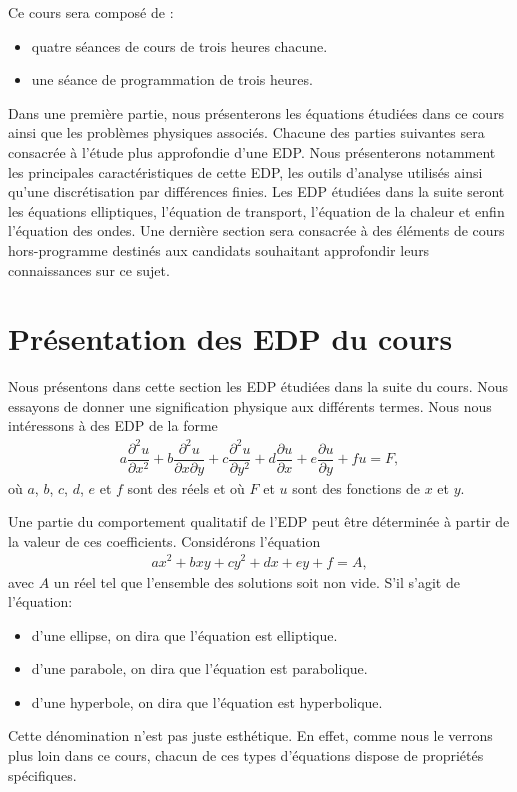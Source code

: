 \documentclass[12pt,a4paper,twoside]{article}
\begin{document}
Ce cours sera compos\'e de :
\begin{itemize}
\item quatre s\'eances de cours de trois heures chacune.
\item une s\'eance de programmation de trois heures.
\end{itemize}
Dans une premi\`ere partie, nous pr\'esenterons les \'equations \'etudi\'ees
dans ce cours ainsi que les probl\`emes physiques associ\'es.
Chacune des parties suivantes sera consacr\'ee \`a l'\'etude plus approfondie
d'une EDP. Nous pr\'esenterons notamment les principales caract\'eristiques de cette EDP,
les outils d'analyse utilis\'es ainsi qu'une discr\'etisation par diff\'erences finies.
Les EDP \'etudi\'ees dans la suite seront les \'equations elliptiques,
l'\'equation de transport, l'\'equation de la chaleur et enfin
l'\'equation des ondes.
Une derni\`ere section sera consacr\'ee \`a des \'el\'ements de cours
hors-programme destin\'es aux candidats souhaitant approfondir
leurs connaissances sur ce sujet.

\newpage

\section{Pr\'esentation des EDP du cours}

Nous pr\'esentons dans cette section les EDP \'etudi\'ees dans la suite du cours.
Nous essayons de donner une signification physique aux diff\'erents termes.
Nous nous int\'eressons \`a des EDP de la forme
\begin{align}
  \label{eq:EDP_type}
  a \dfrac{\partial^2 u}{\partial x^2} + b \dfrac{\partial^2 u}{\partial x \partial y}
  + c \dfrac{\partial^2 u}{\partial y^2} + d \dfrac{\partial u}{\partial x}
  + e \dfrac{\partial u}{\partial y} + f u = F ,
\end{align}
o\`u $a$, $b$, $c$, $d$, $e$ et $f$ sont des r\'eels et o\`u $F$ et $u$
sont des fonctions de $x$ et $y$.

Une partie du comportement qualitatif de l'EDP peut \^etre d\'etermin\'ee
\`a partir de la valeur de ces coefficients.
Consid\'erons l'\'equation
\begin{align}
  \label{eq:EDP_geom}
  a x^2 + b xy + c y^2 + d x + e y + f = A ,
\end{align}
avec $A$ un r\'eel tel que l'ensemble des solutions soit non vide.
S'il s'agit de l'\'equation:
\begin{itemize}
\item d'une ellipse, on dira que l'\'equation est elliptique.
\item d'une parabole, on dira que l'\'equation est parabolique.
\item d'une hyperbole, on dira que l'\'equation est hyperbolique.
\end{itemize}
Cette d\'enomination n'est pas juste esth\'etique.
En effet, comme nous le verrons plus loin dans ce cours,
chacun de ces types d'\'equations dispose de propri\'et\'es sp\'ecifiques.
\end{document}
